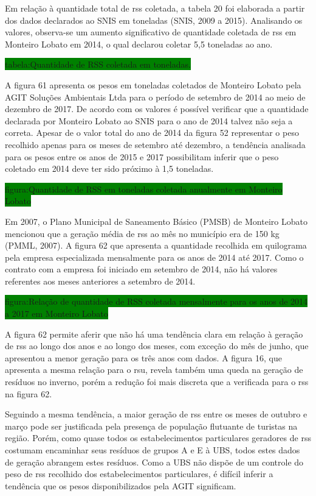 	Em relação à quantidade total de \gls{rss} coletada, a tabela 20 foi elaborada a partir dos dados declarados ao SNIS em toneladas (SNIS, 2009 a 2015). Analisando os valores, observa-se um aumento significativo de quantidade coletada de \gls{rss} em Monteiro Lobato em 2014, o qual declarou coletar 5,5 toneladas ao ano.
	
	\colorbox{green}{tabela:Quantidade de RSS coletada em toneladas.}
	
	A figura 61 apresenta os pesos em toneladas coletados de Monteiro Lobato pela AGIT Soluções Ambientais Ltda para o período de setembro de 2014 ao meio de dezembro de 2017. De acordo com os valores é possível verificar que a quantidade declarada por Monteiro Lobato ao SNIS para o ano de 2014 talvez não seja a correta. Apesar de o valor total do ano de 2014 da figura 52 representar o peso recolhido apenas para os meses de setembro até dezembro, a tendência analisada para os pesos entre os anos de 2015 e 2017 possibilitam inferir que o peso coletado em 2014 deve ter sido próximo à 1,5 toneladas.
	
	\colorbox{green}{figura:Quantidade de RSS em toneladas coletada anualmente em Monteiro Lobato}
	
	Em 2007, o Plano Municipal de Saneamento Básico (PMSB) de Monteiro Lobato mencionou que a geração média de \gls{rss} ao mês no município era de 150 kg (PMML, 2007). A figura 62 que apresenta a quantidade recolhida em quilograma pela empresa especializada mensalmente para os anos de 2014 até 2017. Como o contrato com a empresa foi iniciado em setembro de 2014, não há valores referentes aos meses anteriores a setembro de 2014.
	
	\colorbox{green}{figura:Relação de quantidade de RSS coletada mensalmente para os anos de 2014 a 2017 em Monteiro Lobato}
	
	A figura 62 permite aferir que não há uma tendência clara em relação à geração de \gls{rss} ao longo dos anos e ao longo dos meses, com exceção do mês de junho, que apresentou a menor geração para os três anos com dados. A figura 16, que apresenta a mesma relação para o \gls{rsu}, revela também uma queda na geração de resíduos no inverno, porém a redução foi mais discreta que a verificada para o \gls{rss} na figura 62.
	
	Seguindo a mesma tendência, a maior geração de \gls{rss} entre os meses de outubro e março pode ser justificada pela presença de população flutuante de turistas na região. Porém, como quase todos os estabelecimentos particulares geradores de \gls{rss} costumam encaminhar seus resíduos de grupos A e E à UBS, todos estes dados de geração abrangem estes resíduos. Como a UBS não dispõe de um controle do peso de \gls{rss} recolhido dos estabelecimentos particulares, é difícil inferir a tendência que os pesos disponibilizados pela AGIT significam.
	
